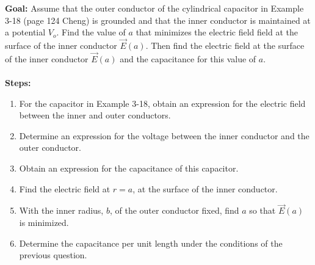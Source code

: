 \documentclass[../../header.tex]{subfiles}
\begin{document}
\textbf{Goal:} Assume that the outer conductor of the cylindrical capacitor in Example 3-18 (page 124 Cheng) is grounded and that the inner conductor is maintained at a potential $V_o$. Find the  value of $a$ that minimizes the electric field field at the surface of the inner conductor $\vec{E}(a)$. Then find the electric field at the surface of the inner conductor $\vec{E}(a)$ and the capacitance for this value of $a$.\\
\\
\textbf{Steps:} 
\begin{enumerate}
\item For the capacitor in Example 3-18, obtain an expression for the electric field between the inner and outer conductors.


\item Determine an expression for the voltage between the inner conductor and the outer conductor.


\item Obtain an expression for the capacitance of this capacitor.


\item Find the electric field at $r=a$, at the surface of the inner conductor.


\item With the inner radius, $b$, of the outer conductor fixed, find $a$ so that $\vec{E}(a)$ is minimized.


\item Determine the capacitance per unit length under the conditions of the previous question.

\end{enumerate}
\end{document}
